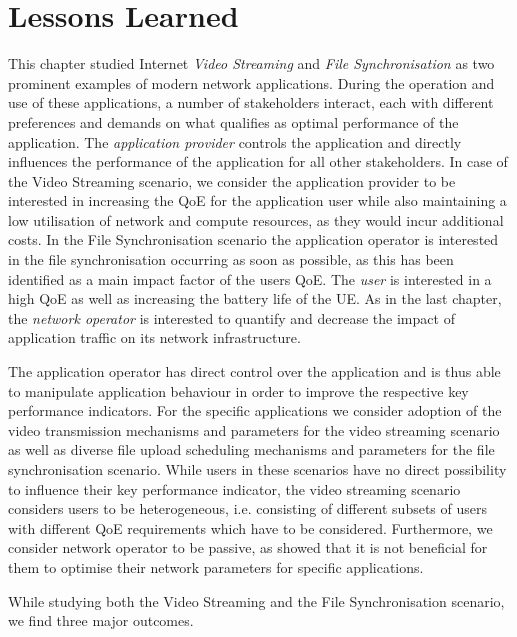\section{Lessons Learned}\label{sec:application:lessons_learned}
This chapter studied Internet \emph{Video Streaming} and \emph{File Synchronisation} as two prominent examples of modern network applications.
During the operation and use of these applications, a number of stakeholders interact, each with different preferences and demands on what qualifies as optimal performance of the application.
The \emph{application provider} controls the application and directly influences the performance of the application for all other stakeholders.
In case of the Video Streaming scenario, we consider the application provider to be interested in increasing the \gls{QoE} for the application user while also maintaining a low utilisation of network and compute resources, as they would incur additional costs.
In the File Synchronisation scenario the application operator is interested in the file synchronisation occurring as soon as possible, as this has been identified as a main impact factor of the users \gls{QoE}.
The \emph{user} is interested in a high \gls{QoE} as well as increasing the battery life of the \gls{UE}.
As in the last chapter, the \emph{network operator} is interested to quantify and decrease the impact of application traffic on its network infrastructure.

The application operator has direct control over the application and is thus able to manipulate application behaviour in order to improve the respective key performance indicators.
For the specific applications we consider adoption of the video transmission mechanisms and parameters for the video streaming scenario as well as diverse file upload scheduling mechanisms and parameters for the file synchronisation scenario.
While users in these scenarios have no direct possibility to influence their key performance indicator, the video streaming scenario considers users to be heterogeneous, i.e. consisting of different subsets of users with different \gls{QoE} requirements which have to be considered.
Furthermore, we consider network operator to be passive, as  showed that it is not beneficial for them to optimise their network parameters for specific applications.

While studying both the Video Streaming and the File Synchronisation scenario, we find three major outcomes.


